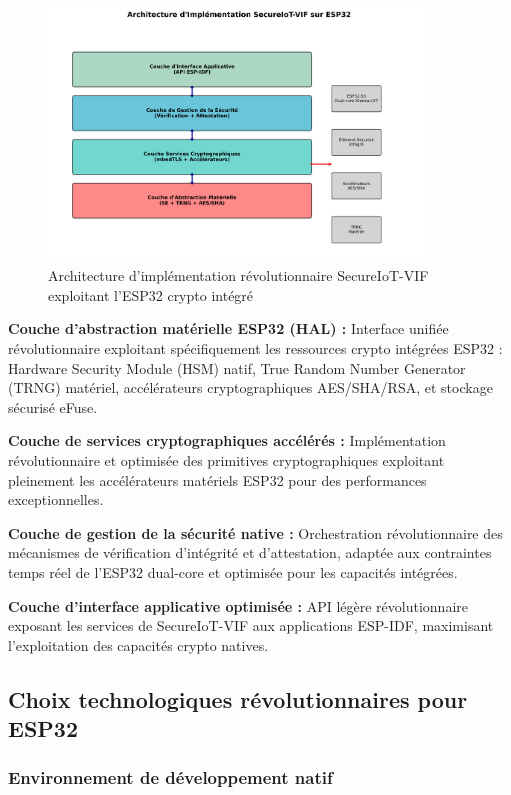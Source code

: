 \begin{figure}[h]
    \centering
    \includegraphics[width=0.9\textwidth]{assets/figures/implementation_architecture_esp32.png}
    \caption{Architecture d'implémentation révolutionnaire SecureIoT-VIF exploitant l'ESP32 crypto intégré}
    \label{fig:implementation-architecture-esp32}
\end{figure}

\textbf{Couche d'abstraction matérielle ESP32 (HAL) :} Interface unifiée révolutionnaire exploitant spécifiquement les ressources crypto intégrées ESP32 : Hardware Security Module (HSM) natif, True Random Number Generator (TRNG) matériel, accélérateurs cryptographiques AES/SHA/RSA, et stockage sécurisé eFuse.

\textbf{Couche de services cryptographiques accélérés :} Implémentation révolutionnaire et optimisée des primitives cryptographiques exploitant pleinement les accélérateurs matériels ESP32 pour des performances exceptionnelles.

\textbf{Couche de gestion de la sécurité native :} Orchestration révolutionnaire des mécanismes de vérification d'intégrité et d'attestation, adaptée aux contraintes temps réel de l'ESP32 dual-core et optimisée pour les capacités intégrées.

\textbf{Couche d'interface applicative optimisée :} API légère révolutionnaire exposant les services de SecureIoT-VIF aux applications ESP-IDF, maximisant l'exploitation des capacités crypto natives.

\subsection{Choix technologiques révolutionnaires pour ESP32}

\subsubsection{Environnement de développement natif}

